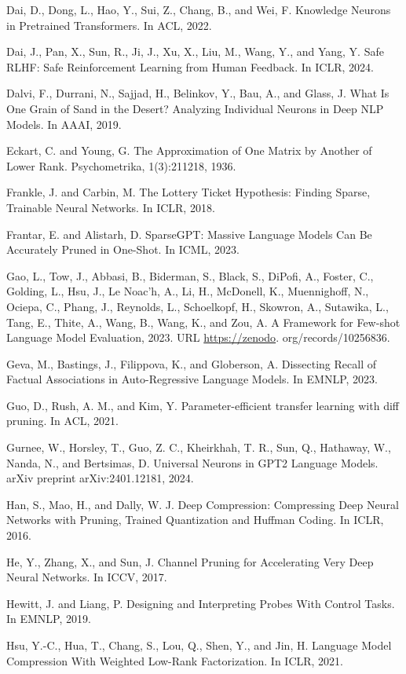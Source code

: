 \documentclass[10pt]{article}
\begin{document}
Dai, D., Dong, L., Hao, Y., Sui, Z., Chang, B., and Wei, F. Knowledge Neurons in Pretrained Transformers. In ACL, 2022.

Dai, J., Pan, X., Sun, R., Ji, J., Xu, X., Liu, M., Wang, Y., and Yang, Y. Safe RLHF: Safe Reinforcement Learning from Human Feedback. In ICLR, 2024.

Dalvi, F., Durrani, N., Sajjad, H., Belinkov, Y., Bau, A., and Glass, J. What Is One Grain of Sand in the Desert? Analyzing Individual Neurons in Deep NLP Models. In AAAI, 2019.

Eckart, C. and Young, G. The Approximation of One Matrix by Another of Lower Rank. Psychometrika, 1(3):211218, 1936.

Frankle, J. and Carbin, M. The Lottery Ticket Hypothesis: Finding Sparse, Trainable Neural Networks. In ICLR, 2018.

Frantar, E. and Alistarh, D. SparseGPT: Massive Language Models Can Be Accurately Pruned in One-Shot. In ICML, 2023.

Gao, L., Tow, J., Abbasi, B., Biderman, S., Black, S., DiPofi, A., Foster, C., Golding, L., Hsu, J., Le Noac'h, A., Li, H., McDonell, K., Muennighoff, N., Ociepa, C., Phang, J., Reynolds, L., Schoelkopf, H., Skowron, A., Sutawika, L., Tang, E., Thite, A., Wang, B., Wang, K., and Zou, A. A Framework for Few-shot Language Model Evaluation, 2023. URL \href{https://zenodo}{https://zenodo}. org/records/10256836.

Geva, M., Bastings, J., Filippova, K., and Globerson, A. Dissecting Recall of Factual Associations in Auto-Regressive Language Models. In EMNLP, 2023.

Guo, D., Rush, A. M., and Kim, Y. Parameter-efficient transfer learning with diff pruning. In ACL, 2021.

Gurnee, W., Horsley, T., Guo, Z. C., Kheirkhah, T. R., Sun, Q., Hathaway, W., Nanda, N., and Bertsimas, D. Universal Neurons in GPT2 Language Models. arXiv preprint arXiv:2401.12181, 2024.

Han, S., Mao, H., and Dally, W. J. Deep Compression: Compressing Deep Neural Networks with Pruning, Trained Quantization and Huffman Coding. In ICLR, 2016.

He, Y., Zhang, X., and Sun, J. Channel Pruning for Accelerating Very Deep Neural Networks. In ICCV, 2017.

Hewitt, J. and Liang, P. Designing and Interpreting Probes With Control Tasks. In EMNLP, 2019.

Hsu, Y.-C., Hua, T., Chang, S., Lou, Q., Shen, Y., and Jin, H. Language Model Compression With Weighted Low-Rank Factorization. In ICLR, 2021.
\end{document}
